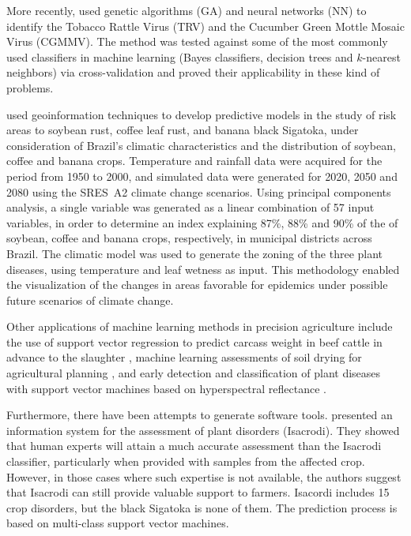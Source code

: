 More recently, \citet{Glezakos2010} used genetic algorithms (GA) and
neural networks (NN) to identify the Tobacco Rattle Virus (TRV) and
the Cucumber Green Mottle Mosaic Virus (CGMMV).
%
The method was tested against some of the most commonly used
classifiers in machine learning (Bayes classifiers, decision trees and
$k$-nearest neighbors) via cross-validation and proved their
applicability in these kind of problems.

\citet{Alves2011} used geoinformation techniques to
develop predictive models in the study of risk areas to soybean rust,
coffee leaf rust, and banana black Sigatoka, under consideration of
Brazil’s climatic characteristics and the distribution of soybean,
coffee and banana crops.
%
Temperature and rainfall data were acquired for the period from 1950
to 2000, and simulated data were generated for 2020, 2050 and 2080
using the SRES~A2 climate change scenarios.
%
Using principal components analysis, a single variable was generated
as a linear combination of 57 input variables, in order to determine
an index explaining 87\%, 88\% and 90\% of the
%
%
of soybean, coffee and
banana crops, respectively, in municipal districts across Brazil.
%
The climatic model was used to generate the zoning of the three plant
diseases, using temperature and leaf wetness as input.
%
%
This methodology enabled the visualization of the changes in areas
favorable for epidemics under possible future scenarios of climate
change.

Other applications of machine learning methods in precision
agriculture include the use of support vector regression to predict
carcass weight in beef cattle in advance to the slaughter
\citep{Alonso2013}, machine learning assessments of soil drying for
agricultural planning \citep{Coopersmith2014}, and early detection and
classification of plant diseases with support vector machines based on
hyperspectral reflectance \citep{Rumpf2010}.

Furthermore, there have been attempts to generate software
tools. \citet{Camargo2012} presented an information
system for the assessment of plant disorders (Isacrodi).
%
They showed that human experts will attain a much accurate assessment
than the Isacrodi classifier, particularly when provided with samples
from the affected crop. However, in those cases where such expertise
is not available, the authors suggest that Isacrodi can still provide
valuable support to farmers.
%
Isacordi includes 15 crop disorders, but the black Sigatoka is none
of them. The prediction process is based on multi-class support vector
machines.

